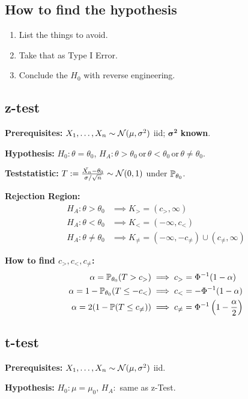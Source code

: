 \subsection{How to find the hypothesis}
\begin{enumerate}
  \item List the things to avoid.
  \item Take that as Type I Error.
  \item Conclude the \(H_0\) with reverse engineering.
\end{enumerate}

\pagebreak
\subsection{z-test}
\textbf{Prerequisites:} \(X_1, \ldots, X_n \sim \Normal(\mu, \sigma^2)\) iid; \(\bm{\sigma^2}\) \textbf{known}.

\textbf{Hypothesis:} \(H_0: \theta = \theta_0\), \(H_A: \theta > \theta_0 \, \text{or} \, \theta < \theta_0 \, \text{or} \, \theta \neq \theta_0\).

\textbf{Teststatistic:} \(T := \frac{\bar{X_n} - \theta_0}{\sigma / \sqrt{n}} \sim \Normal(0, 1)\) under \(\P_{\theta_0}\).

\textbf{Rejection Region:}
\begin{align*}
  H_A: \theta > \theta_0 &\implies K_> = (c_>, \infty) \\
  H_A: \theta < \theta_0 &\implies K_< = (-\infty, c_<) \\
  H_A: \theta \neq \theta_0 &\implies K_{\neq} = (-\infty, -c_{\neq}) \cup (c_{\neq}, \infty)
\end{align*}

\textbf{How to find \(c_>, c_<, c_{\neq}\):}
\begin{align*}
  \alpha = \P_{\theta_0}(T > c_>) &\implies c_> = \Phi^{-1}(1 - \alpha) \\
  \alpha = 1 - \P_{\theta_0}(T \leq -c_<) &\implies c_< = -\Phi^{-1}(1 - \alpha) \\
  \alpha = 2(1 - \P(T \leq c_{\neq})) &\implies c_{\neq} = \Phi^{-1}\left(1 - \frac{\alpha}{2}\right)
\end{align*}

\subsection{t-test}
\textbf{Prerequisites:} \(X_1, \ldots, X_n \sim \Normal(\mu, \sigma^2)\) iid.

\textbf{Hypothesis:} \(H_0: \mu = \mu_0\), \(H_A:\) same as z-Test.

